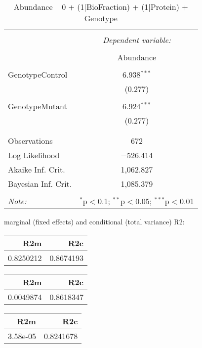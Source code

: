 \documentclass[11pt]{report}
\begin{document}
\begin{table}[!htbp] \centering 
  \caption{Abundance ~ 0 + (1|BioFraction) + (1|Protein) + Genotype} 
  \label{} 
\begin{tabular}{@{\extracolsep{5pt}}lc} 
\\[-1.8ex]\hline 
\hline \\[-1.8ex] 
 & \multicolumn{1}{c}{\textit{Dependent variable:}} \\ 
\cline{2-2} 
\\[-1.8ex] & Abundance \\ 
\hline \\[-1.8ex] 
 GenotypeControl & 6.938$^{***}$ \\ 
  & (0.277) \\ 
  & \\ 
 GenotypeMutant & 6.924$^{***}$ \\ 
  & (0.277) \\ 
  & \\ 
\hline \\[-1.8ex] 
Observations & 672 \\ 
Log Likelihood & $-$526.414 \\ 
Akaike Inf. Crit. & 1,062.827 \\ 
Bayesian Inf. Crit. & 1,085.379 \\ 
\hline 
\hline \\[-1.8ex] 
\textit{Note:}  & \multicolumn{1}{r}{$^{*}$p$<$0.1; $^{**}$p$<$0.05; $^{***}$p$<$0.01} \\ 
\end{tabular} 
\end{table} 
marginal (fixed effects) and conditional (total variance) R2:

\begin{tabular}{r|r}
\hline
R2m & R2c\\
\hline
0.8250212 & 0.8674193\\
\hline
\end{tabular}

\begin{tabular}{r|r}
\hline
R2m & R2c\\
\hline
0.0049874 & 0.8618347\\
\hline
\end{tabular}

\begin{tabular}{r|r}
\hline
R2m & R2c\\
\hline
3.58e-05 & 0.8241678\\
\hline
\end{tabular}
\end{document}
